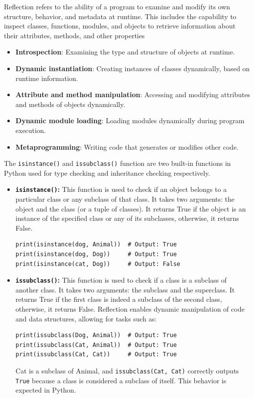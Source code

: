 Reflection refers to the ability of a program to examine and modify its own structure, behavior, and metadata at runtime. This includes the capability to inspect classes, functions, modules, and objects to retrieve information about their attributes, methods, and other properties

\begin{itemize}
    \item \textbf{Introspection}: Examining the type and structure of objects at runtime.
    \item \textbf{Dynamic instantiation}: Creating instances of classes dynamically, based on runtime information.
    \item \textbf{Attribute and method manipulation}: Accessing and modifying attributes and methods of objects dynamically.
    \item \textbf{Dynamic module loading}: Loading modules dynamically during program execution.
    \item \textbf{Metaprogramming}: Writing code that generates or modifies other code.
\end{itemize}

\newpage
The \texttt{isinstance()} and \texttt{issubclass()} function are two built-in functions in Python used for type checking and inheritance checking respectively.

\begin{itemize}
\item \textbf{\texttt{isinstance()}:} This function is used to check if an object belongs to a particular class or any subclass of that class. It takes two arguments: the object and the class (or a tuple of classes). It returns True if the object is an instance of the specified class or any of its subclasses, otherwise, it returns False.
\begin{codebox}
\begin{verbatim}
print(isinstance(dog, Animal))  # Output: True
print(isinstance(dog, Dog))     # Output: True
print(isinstance(cat, Dog))     # Output: False
\end{verbatim}
\end{codebox}

\item \textbf{\texttt{issubclass()}:} This function is used to check if a class is a subclass of another class. It takes two arguments: the subclass and the superclass. It returns True if the first class is indeed a subclass of the second class, otherwise, it returns False. Reflection enables dynamic manipulation of code and data structures, allowing for tasks such as:

\begin{codebox}
\begin{verbatim}
print(issubclass(Dog, Animal))  # Output: True
print(issubclass(Cat, Animal))  # Output: True
print(issubclass(Cat, Cat))     # Output: True
\end{verbatim}
\end{codebox}

Cat is a subclass of Animal, and \texttt{issubclass(Cat, Cat)} correctly outputs \texttt{True} because a class is considered a subclass of itself. This behavior is expected in Python.
\end{itemize}

